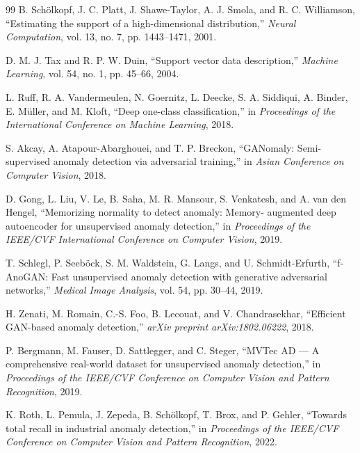 \documentclass[10pt,conference]{IEEEtran}
\begin{document}
\begin{thebibliography}{99}
B. Sch\"olkopf, J. C. Platt, J. Shawe-Taylor, A. J. Smola, and
R. C. Williamson, ``Estimating the support of a high-dimensional
distribution,'' \emph{Neural Computation}, vol. 13, no. 7, pp. 1443--1471,
2001.

D. M. J. Tax and R. P. W. Duin, ``Support vector data description,''
\emph{Machine Learning}, vol. 54, no. 1, pp. 45--66, 2004.

L. Ruff, R. A. Vandermeulen, N. Goernitz, L. Deecke, S. A. Siddiqui,
A. Binder, E. M\"uller, and M. Kloft, ``Deep one-class classification,'' in
\emph{Proceedings of the International Conference on Machine Learning}, 2018.

S. Akcay, A. Atapour-Abarghouei, and T. P. Breckon, ``GANomaly:
Semi-supervised anomaly detection via adversarial training,'' in
\emph{Asian Conference on Computer Vision}, 2018.

D. Gong, L. Liu, V. Le, B. Saha, M. R. Mansour, S. Venkatesh, and
A. van den Hengel, ``Memorizing normality to detect anomaly: Memory-
augmented deep autoencoder for unsupervised anomaly detection,'' in
\emph{Proceedings of the IEEE/CVF International Conference on Computer
Vision}, 2019.

T. Schlegl, P. Seeb\"ock, S. M. Waldstein, G. Langs, and
U. Schmidt-Erfurth, ``f-AnoGAN: Fast unsupervised anomaly detection with
generative adversarial networks,'' \emph{Medical Image Analysis}, vol. 54,
pp. 30--44, 2019.

H. Zenati, M. Romain, C.-S. Foo, B. Lecouat, and V. Chandrasekhar,
``Efficient GAN-based anomaly detection,'' \emph{arXiv preprint
arXiv:1802.06222}, 2018.

P. Bergmann, M. Fauser, D. Sattlegger, and C. Steger, ``MVTec AD --- A
comprehensive real-world dataset for unsupervised anomaly detection,'' in
\emph{Proceedings of the IEEE/CVF Conference on Computer Vision and Pattern
Recognition}, 2019.

K. Roth, L. Pemula, J. Zepeda, B. Sch\"olkopf, T. Brox, and P. Gehler,
``Towards total recall in industrial anomaly detection,'' in
\emph{Proceedings of the IEEE/CVF Conference on Computer Vision and Pattern
Recognition}, 2022.


\end{thebibliography}
\end{document}
